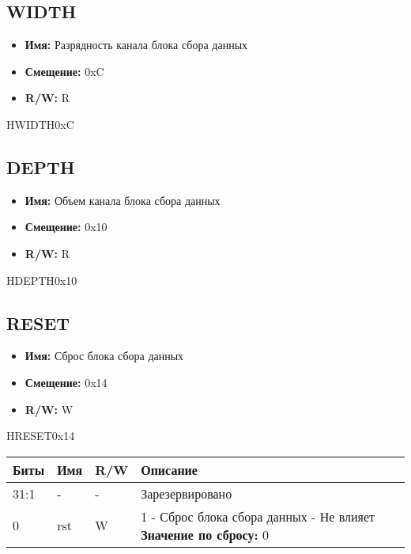 \subsection{WIDTH}
\label{sec:WIDTH}
\begin{itemize}
  \setlength{\itemsep}{0pt}
  \setlength{\parskip}{0pt}
  \setlength{\parsep}{0pt}
  \item \textbf{Имя:} Разрядность канала блока сбора данных
  \item \textbf{Смещение:} 0xC
  \item \textbf{R/W:} R
\end{itemize}
\begin{register}{H}{WIDTH}{0xC}
%
\regnewline%
\end{register}

\subsection{DEPTH}
\label{sec:DEPTH}
\begin{itemize}
  \setlength{\itemsep}{0pt}
  \setlength{\parskip}{0pt}
  \setlength{\parsep}{0pt}
  \item \textbf{Имя:} Объем канала блока сбора данных
  \item \textbf{Смещение:} 0x10
  \item \textbf{R/W:} R
\end{itemize}
\begin{register}{H}{DEPTH}{0x10}
%
\regnewline%
\end{register}

\subsection{RESET}
\label{sec:RESET}
\begin{itemize}
  \setlength{\itemsep}{0pt}
  \setlength{\parskip}{0pt}
  \setlength{\parsep}{0pt}
  \item \textbf{Имя:} Сброс блока сбора данных
  \item \textbf{Смещение:} 0x14
  \item \textbf{R/W:} W
\end{itemize}
\begin{register}{H}{RESET}{0x14}
%
%
\regnewline%
\end{register}
\begin{longtable}{| l | l | l | p{7.5cm} |}
\hline
\textbf{Биты} & \textbf{Имя} & \textbf{R/W} & \textbf{Описание} \\ \hline
31:1 & - & - & Зарезервировано \\ \hline
0 & rst & W & 1 - Сброс блока сбора данных
\newline 0 - Не влияет
\newline \textbf{Значение по сбросу:} 0 \\ \hline 
\end{longtable}

